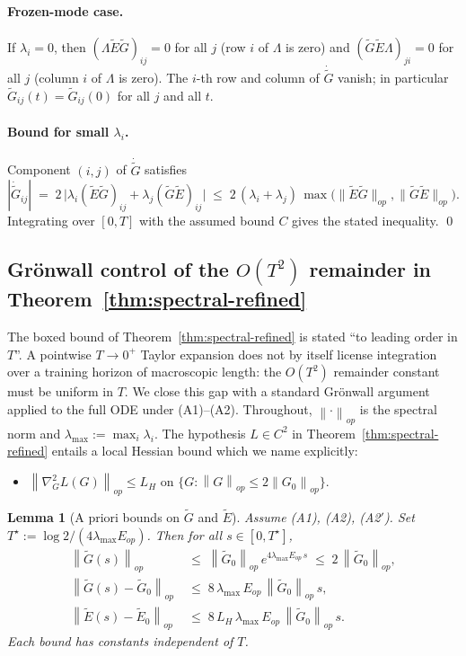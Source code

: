 \documentclass{article}
\newtheorem{lemma}[theorem]{Lemma}
\newcommand{\norm}[1]{\left\|#1\right\|}
\newcommand{\E}{E}
\newcommand{\Gtilde}{\widetilde{G}}
\newcommand{\Etilde}{\widetilde{\E}}
\begin{document}
\paragraph{Frozen-mode case.}
If $\lambda_i = 0$, then $(\Lambda \Etilde \Gtilde)_{ij} = 0$ for all $j$
(row $i$ of $\Lambda$ is zero) and $(\Gtilde\Etilde\Lambda)_{ji} = 0$ for
all $j$ (column $i$ of $\Lambda$ is zero). The $i$-th row and column of
$\dot{\Gtilde}$ vanish; in particular $\Gtilde_{ij}(t) = \Gtilde_{ij}(0)$
for all $j$ and all $t$.

\paragraph{Bound for small $\lambda_i$.}
Component $(i,j)$ of $\dot{\Gtilde}$ satisfies
\[
|\dot{\Gtilde}_{ij}|
\;=\; 2\,\bigl|\lambda_i (\Etilde\Gtilde)_{ij} + \lambda_j (\Gtilde\Etilde)_{ij}\bigr|
\;\leq\; 2\,(\lambda_i + \lambda_j)\,
\max\bigl(\|\Etilde\Gtilde\|_{op}, \|\Gtilde\Etilde\|_{op}\bigr).
\]
Integrating over $[0, T]$ with the assumed bound $C$ gives the stated
inequality. \qed

\subsection{Gr\"onwall control of the $O(T^2)$ remainder in
Theorem~\ref{thm:spectral-refined}}
\label{app:gronwall}

The boxed bound of Theorem~\ref{thm:spectral-refined} is stated ``to
leading order in $T$''. A pointwise $T \to 0^+$ Taylor expansion does
not by itself license integration over a training horizon of
macroscopic length: the $O(T^2)$ remainder constant must be uniform in
$T$. We close this gap with a standard Gr\"onwall argument applied to
the full ODE under (A1)--(A2). Throughout, $\norm{\cdot}_{op}$ is the
spectral norm and $\lambda_{\max} := \max_i \lambda_i$. The hypothesis
$L \in C^2$ in Theorem~\ref{thm:spectral-refined} entails a local
Hessian bound which we name explicitly:
\begin{itemize}
\item[(A2$'$)] $\norm{\nabla^2_G L(G)}_{op} \leq L_H$ on
$\{G : \norm{G}_{op} \leq 2\norm{G_0}_{op}\}$.
\end{itemize}

\begin{lemma}[A priori bounds on $\Gtilde$ and $\Etilde$]
\label{lem:gronwall-apriori}
Assume (A1), (A2), (A2$'$). Set $T^\star := \log 2 / (4\lambda_{\max}
E_{op})$. Then for all $s \in [0, T^\star]$,
\begin{align}
\norm{\Gtilde(s)}_{op}
&\;\leq\; \norm{\Gtilde_0}_{op}\, e^{4\lambda_{\max} E_{op}\, s}
\;\leq\; 2\,\norm{\Gtilde_0}_{op},
\label{eq:gronwall-G}\\
\norm{\Gtilde(s) - \Gtilde_0}_{op}
&\;\leq\; 8\,\lambda_{\max}\, E_{op}\,\norm{\Gtilde_0}_{op}\, s,
\label{eq:gronwall-Gdrift}\\
\norm{\Etilde(s) - \Etilde_0}_{op}
&\;\leq\; 8\, L_H\, \lambda_{\max}\, E_{op}\,\norm{\Gtilde_0}_{op}\, s.
\label{eq:gronwall-E}
\end{align}
Each bound has constants \emph{independent of $T$}.
\end{lemma}
\end{document}

